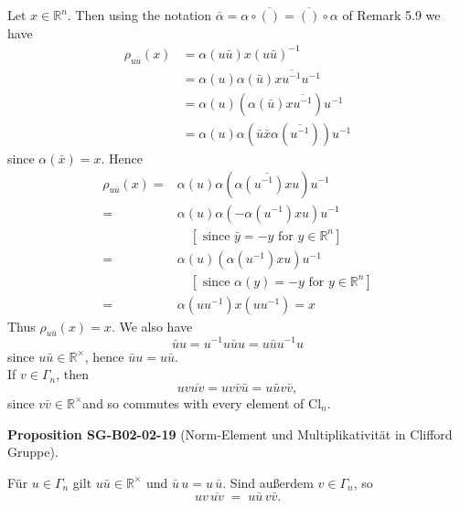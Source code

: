 \documentclass[10pt, letterpaper]{article}
\newcommand{\R}{\mathbb{R}}
\newcommand{\CustomHeading}[3]{%
  \par\medskip\noindent%
  \textbf{#1 #2} \textnormal{(#3)}.\enskip%
}
\newenvironment{PROP}[2]{\begin{unitbox}\CustomHeading{Proposition}{#1}{#2}}{\end{unitbox}}
\begin{document}
Let $x \in \mathbb{R}^{n}$. Then using the notation $\bar{\alpha}=\alpha \circ \overline{()}=\overline{()} \circ \alpha$ of Remark 5.9 we have
$$
\begin{aligned}
\rho_{u \bar{u}}(x) & =\alpha(u \bar{u}) x(u \bar{u})^{-1} \\
& =\alpha(u) \alpha(\bar{u}) x \overline{u^{-1}} u^{-1} \\
& =\alpha(u)\left(\alpha(\bar{u}) x \overline{u^{-1}}\right) u^{-1} \\
& =\alpha(u) \alpha\left(\bar{u} \bar{x} \alpha\left(\overline{u^{-1}}\right)\right) u^{-1}
\end{aligned}
$$
since $\alpha(\bar{x})=x$. Hence
$$
\begin{aligned}
\rho_{u \bar{u}}(x)= & \alpha(u) \alpha\left(\overline{\alpha\left(u^{-1}\right) x u}\right) u^{-1} \\
= & \alpha(u) \alpha\left(-\alpha\left(u^{-1}\right) x u\right) u^{-1} \\
& \quad\left[\text { since } \bar{y}=-y \text { for } y \in \mathbb{R}^{n}\right] \\
= & \alpha(u)\left(\alpha\left(u^{-1}\right) x u\right) u^{-1} \\
& \quad\left[\text { since } \alpha(y)=-y \text { for } y \in \mathbb{R}^{n}\right] \\
= & \alpha\left(u u^{-1}\right) x\left(u u^{-1}\right)=x
\end{aligned}
$$
Thus $\rho_{u \bar{u}}(x)=x$. We also have
$$
\bar{u} u=u^{-1} u \bar{u} u=u \bar{u} u^{-1} u
$$
since $u \bar{u} \in \mathbb{R}^{\times}$, hence $\bar{u} u=u \bar{u}$.\\
If $v \in \Gamma_{n}$, then
$$
u v \overline{u v}=u v \bar{v} \bar{u}=u \bar{u} v \bar{v},
$$
since $v \bar{v} \in \mathbb{R}^{\times}$and so commutes with every element of $\mathrm{Cl}_{n}$.



\begin{PROP}{SG-B02-02-19}{Norm-Element und Multiplikativität in Clifford Gruppe}
Für \(u \in \Gamma_n\) gilt \(u\bar u \in \R^{\times}\) und \(\bar u\,u = u\,\bar u\).
Sind außerdem \(v \in \Gamma_n\), so
\[
uv\,\overline{uv} \;=\; u\bar u \, v\bar v.
\]
\end{PROP}
\end{document}
